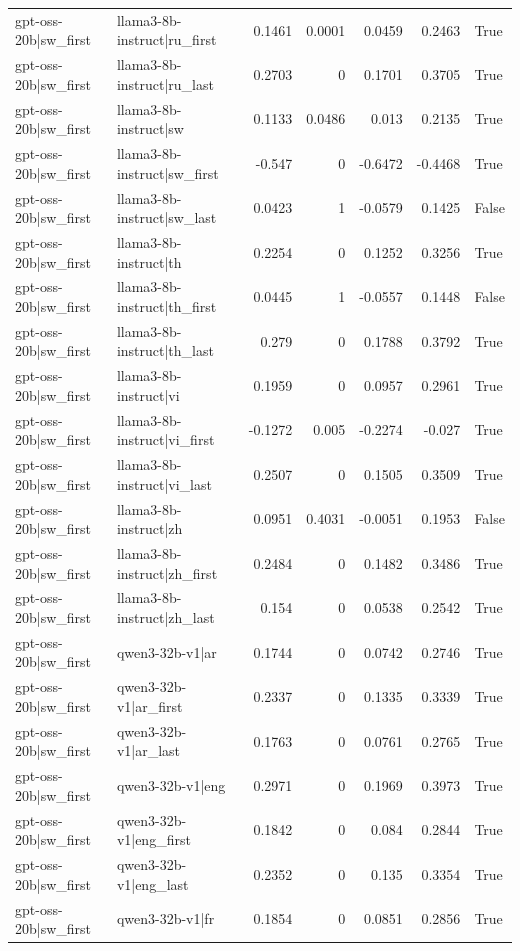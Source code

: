 \begin{table}
\begin{tabular}{l l r r r r l}
gpt-oss-20b|sw_first & llama3-8b-instruct|ru_first & 0.1461 & 0.0001 & 0.0459 & 0.2463 & True \\
gpt-oss-20b|sw_first & llama3-8b-instruct|ru_last & 0.2703 & 0 & 0.1701 & 0.3705 & True \\
gpt-oss-20b|sw_first & llama3-8b-instruct|sw & 0.1133 & 0.0486 & 0.013 & 0.2135 & True \\
gpt-oss-20b|sw_first & llama3-8b-instruct|sw_first & -0.547 & 0 & -0.6472 & -0.4468 & True \\
gpt-oss-20b|sw_first & llama3-8b-instruct|sw_last & 0.0423 & 1 & -0.0579 & 0.1425 & False \\
gpt-oss-20b|sw_first & llama3-8b-instruct|th & 0.2254 & 0 & 0.1252 & 0.3256 & True \\
gpt-oss-20b|sw_first & llama3-8b-instruct|th_first & 0.0445 & 1 & -0.0557 & 0.1448 & False \\
gpt-oss-20b|sw_first & llama3-8b-instruct|th_last & 0.279 & 0 & 0.1788 & 0.3792 & True \\
gpt-oss-20b|sw_first & llama3-8b-instruct|vi & 0.1959 & 0 & 0.0957 & 0.2961 & True \\
gpt-oss-20b|sw_first & llama3-8b-instruct|vi_first & -0.1272 & 0.005 & -0.2274 & -0.027 & True \\
gpt-oss-20b|sw_first & llama3-8b-instruct|vi_last & 0.2507 & 0 & 0.1505 & 0.3509 & True \\
gpt-oss-20b|sw_first & llama3-8b-instruct|zh & 0.0951 & 0.4031 & -0.0051 & 0.1953 & False \\
gpt-oss-20b|sw_first & llama3-8b-instruct|zh_first & 0.2484 & 0 & 0.1482 & 0.3486 & True \\
gpt-oss-20b|sw_first & llama3-8b-instruct|zh_last & 0.154 & 0 & 0.0538 & 0.2542 & True \\
gpt-oss-20b|sw_first & qwen3-32b-v1|ar & 0.1744 & 0 & 0.0742 & 0.2746 & True \\
gpt-oss-20b|sw_first & qwen3-32b-v1|ar_first & 0.2337 & 0 & 0.1335 & 0.3339 & True \\
gpt-oss-20b|sw_first & qwen3-32b-v1|ar_last & 0.1763 & 0 & 0.0761 & 0.2765 & True \\
gpt-oss-20b|sw_first & qwen3-32b-v1|eng & 0.2971 & 0 & 0.1969 & 0.3973 & True \\
gpt-oss-20b|sw_first & qwen3-32b-v1|eng_first & 0.1842 & 0 & 0.084 & 0.2844 & True \\
gpt-oss-20b|sw_first & qwen3-32b-v1|eng_last & 0.2352 & 0 & 0.135 & 0.3354 & True \\
gpt-oss-20b|sw_first & qwen3-32b-v1|fr & 0.1854 & 0 & 0.0851 & 0.2856 & True \\

\end{tabular}
\end{table}
